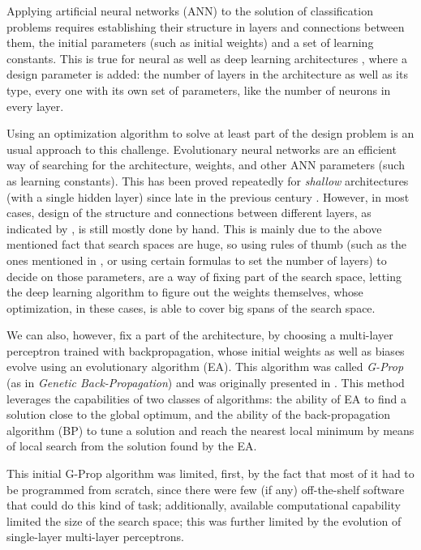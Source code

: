 \documentclass[runningheads]{llncs}
\begin{document}
Applying artificial neural networks (ANN) to the solution of
classification problems requires establishing their structure in
layers and connections between them, the initial parameters (such as
initial weights) and a set of learning constants. This is true for
neural as well as deep learning architectures
\cite{goodfellow,nielsen}, where a design parameter is added: the
number of layers in the architecture as well as its type, every one
with its own set of parameters, like the number of neurons in every
layer.

Using an optimization algorithm to solve at least part of the design problem
is an usual approach to this challenge. Evolutionary neural networks are an efficient way of searching for the
architecture, weights, and other ANN parameters (such as learning
constants). This has been proved
repeatedly for {\em shallow} architectures (with a single hidden
layer) since late in the previous century
\cite{yao1993evolutionary,CastilloNPL,stanley2002evolving}. However, in most cases, design
of the structure and connections between different layers, as
indicated by \cite{miikkulainen2019evolving}, is still mostly done by
hand. This is mainly due to the above mentioned fact that search
spaces are huge, so using rules of thumb (such as the ones mentioned
in \cite{qolomany2017parameters}, or using certain formulas to set the
number of layers) to decide on those parameters,
are a way of fixing part of the search space, letting the deep
learning algorithm to figure out the weights themselves, whose
optimization, in these cases, is able to cover big spans of the search
space.

We can also, however, fix a part of the architecture, by choosing a
multi-layer perceptron trained with backpropagation, whose initial
weights as well as biases evolve using an evolutionary algorithm (EA). This
algorithm was called \emph{G-Prop} (as in \emph{Genetic Back-Propagation})
and was originally presented in \cite{castilloNC,CastilloNPL}. This
method leverages the capabilities of two classes of algorithms: the
ability of EA to find a solution close to the global optimum, and the
ability of the back-propagation algorithm (BP) \cite{Rumelhart86} to tune a solution and
reach the nearest local minimum by means of local search from the
solution found by the EA.

This initial G-Prop algorithm was limited, first, by the fact that
most of it had to be programmed from scratch, since there were few (if
any) off-the-shelf software that could do this kind of task;
additionally, available computational capability limited the size of
the search space;
this was further limited by the evolution of single-layer multi-layer perceptrons.
\end{document}
